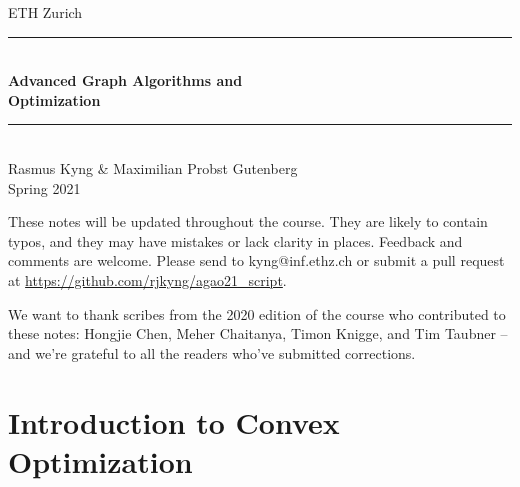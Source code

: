 \documentclass[12pt,a4paper,openany]{book}
\begin{document}
%
%
\begin{titlepage}

\newcommand{\HRule}{\rule{\linewidth}{0.5mm}} %
{\center

{\Large ETH Zurich}\\[1.5cm]
\HRule \\[0.4cm]
{ \huge \bfseries Advanced Graph Algorithms and \\ Optimization}\\[0.4cm] %
\HRule \\[1.5cm]

{\LARGE Rasmus Kyng \& Maximilian Probst Gutenberg}\\[2cm]


{\Large Spring 2021}\\[2cm] %

}
\vfill




\end{titlepage}

These notes will be updated throughout the course.
They are likely to contain typos, and they may have mistakes or
lack clarity in places. Feedback and comments are 
welcome. Please send to kyng@inf.ethz.ch or submit a pull request at
\url{https://github.com/rjkyng/agao21_script}.

We want to thank scribes from the 2020 edition of the course who
contributed to these notes: Hongjie
Chen, Meher Chaitanya, Timon Knigge, and Tim Taubner -- and we're
grateful to all the readers who've submitted corrections.

\newpage

\tableofcontents





\label{part:intro}


\part{Introduction to Convex Optimization}
\label{part:convex}



% 
% 
\end{document}
